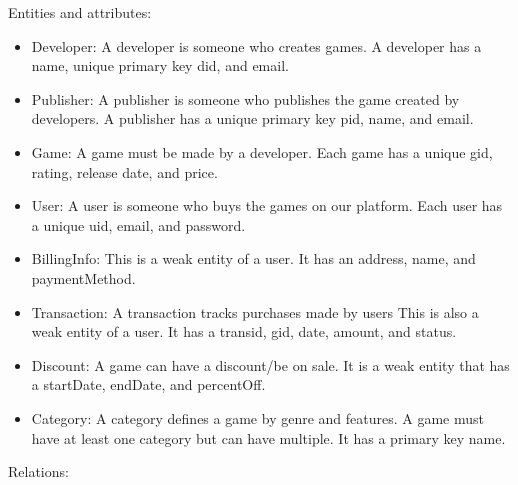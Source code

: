\documentclass[12pt, oneside]{article}
\begin{document}
Entities and attributes:
\begin{itemize}
    \item Developer: A developer is someone who creates games. A developer has a name, unique primary key did, and email.
    \item Publisher: A publisher is someone who publishes the game created by developers. A publisher has a unique primary key pid, name, and email.
    \item Game: A game must be made by a developer. Each game has a unique gid, rating, release date, and price.
    \item User: A user is someone who buys the games on our platform. Each user has a unique uid, email, and password.
    \item BillingInfo: This is a weak entity of a user. It has an address, name, and paymentMethod.
    \item Transaction: A transaction tracks purchases made by users This is also a weak entity of a user. It has a transid, gid, date, amount, and status.
    \item Discount: A game can have a discount/be on sale. It is a weak entity that has a startDate, endDate, and percentOff.
    \item Category: A category defines a game by genre and features. A game must have at least one category but can have multiple. It has a primary key name.
\end{itemize}
Relations:
\end{document}
